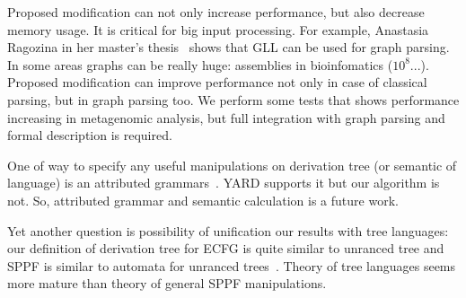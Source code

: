 \documentclass[runningheads,a4paper]{llncs}
\begin{document}
Proposed modification can not only increase performance, but also decrease memory usage. 
It is critical for big input processing.
For example, Anastasia Ragozina in her master's thesis~\cite{ragozina} shows that GLL can be used for graph parsing.  
In some areas graphs can be really huge: assemblies in bioinfomatics ($10^8$...).
Proposed modification can improve performance not only in case of classical parsing, but in graph parsing too. 
We perform some tests that shows performance increasing in metagenomic analysis, but full integration with graph parsing and formal description is required.

One of way to specify any useful manipulations on derivation tree (or semantic of language) is an attributed grammars~\cite{!!!}.
YARD supports it but our algorithm is not.
So, attributed grammar and semantic calculation is a future work.

Yet another question is possibility of unification our results with tree languages: our definition of derivation tree for ECFG is quite similar to unranced tree and SPPF is similar to automata for unranced trees~\cite{TATA}.
Theory of tree languages seems more mature than theory of general SPPF manipulations.





\end{document}
